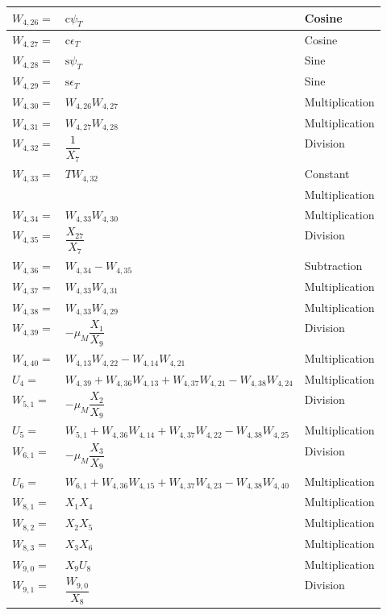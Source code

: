 {\begin{longtable}{|p{1.5cm}|l|p{2cm}|}
$W_{4,26}=$ & $ \text{c}\psi_{T} $ & Cosine \\ \hline
$W_{4,27}=$ & $ \text{c}\epsilon_{T} $ & Cosine \\ \hline
$W_{4,28}=$ & $ \text{s}\psi_{T} $ & Sine \\ \hline
$W_{4,29}=$ & $ \text{s}\epsilon_{T} $ & Sine \\ \hline
$W_{4,30}=$ & $ W_{4,26}W_{4,27} $ & Multiplication \\ \hline
$W_{4,31}=$ & $ W_{4,27}W_{4,28} $ & Multiplication \\ \hline
$W_{4,32}=$ & $ \dfrac{1}{X_{7}} $ & Division \\ \hline
$W_{4,33}=$ & $ T W_{4,32} $ & Constant  \\ 
& & Multiplication \\ \hline
$W_{4,34}=$ & $ W_{4,33}W_{4,30} $ & Multiplication \\ \hline
$W_{4,35}=$ & $ \dfrac{X_{27}}{X_{7}} $ & Division \\ \hline
$W_{4,36}=$ & $ W_{4,34}-W_{4,35} $ & Subtraction \\ \hline
$W_{4,37}=$ & $ W_{4,33}W_{4,31} $ & Multiplication \\ \hline
$W_{4,38}=$ & $ W_{4,33}W_{4,29} $ & Multiplication \\ \hline
$W_{4,39}=$ & $ -\mu_{M}\dfrac{X_{1}}{X_{9}} $ & Division \\ \hline
$W_{4,40}=$ & $ W_{4,13}W_{4,22}-W_{4,14}W_{4,21} $ & Multiplication \\ \hline
$U_{4}=$ & $ W_{4,39}+W_{4,36}W_{4,13}+W_{4,37}W_{4,21}-W_{4,38}W_{4,24} $ & Multiplication \\ \hline
$W_{5,1}=$ & $-\mu_{M}\dfrac{X_{2}}{X_{9}}  $ & Division \\ \hline
$U_{5}=$ & $ W_{5,1}+W_{4,36}W_{4,14}+W_{4,37}W_{4,22}-W_{4,38}W_{4,25} $ & Multiplication \\ \hline
$W_{6,1}=$ & $ -\mu_{M}\dfrac{X_{3}}{X_{9}} $ & Division \\ \hline
$U_{6}=$ & $W_{6,1}+W_{4,36}W_{4,15}+W_{4,37}W_{4,23}-W_{4,38}W_{4,40}  $ & Multiplication \\ \hline
$W_{8,1}=$ & $ X_{1}X_{4} $ & Multiplication \\ \hline
$W_{8,2}=$ & $ X_{2}X_{5} $ & Multiplication \\ \hline
$W_{8,3}=$ & $ X_{3}X_{6} $ & Multiplication \\ \hline
$W_{9,0}=$ & $ X_{9}U_{8} $ & Multiplication \\ \hline
$W_{9,1}=$ & $ \dfrac{W_{9,0}}{X_{8}} $ & Division \\ \hline

\end{longtable}}
